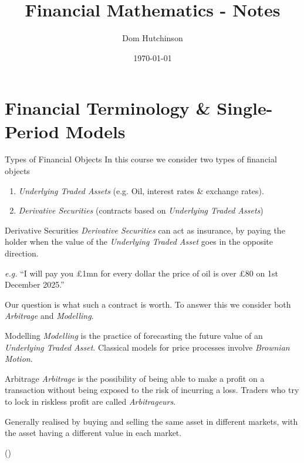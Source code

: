 \documentclass[11pt,a4paper]{article}
\begin{document}
\title{Financial Mathematics - Notes}
\author{Dom Hutchinson}
\date{\today}
\maketitle

\tableofcontents\newpage

\section{Financial Terminology \& Single-Period Models}\label{sec_financial_terminology_and_single_period_model}

  \begin{proposition}{Types of Financial Objects}
    In this course we consider two types of financial objects
    \begin{enumerate}
      \item \textit{Underlying Traded Assets} (e.g. Oil, interest rates \& exchange rates).
      \item \textit{Derivative Securities} (contracts based on \textit{Underlying Traded Assets})
    \end{enumerate}
  \end{proposition}

  \begin{proposition}{Derivative Securities}
    \textit{Derivative Securities} can act as insurance, by paying the holder when the value of the \textit{Underlying Traded Asset} goes in the opposite direction.
    \par \textit{e.g.} ``I will pay you £1mn for every dollar the price of oil is over £80 on 1st December 2025.''
    \par Our question is what such a contract is worth. To answer this we consider both \textit{Arbitrage} and \textit{Modelling}.
  \end{proposition}

  \begin{definition}{Modelling}
    \textit{Modelling} is the practice of forecasting the future value of an \textit{Underlying Traded Asset}. Classical models for price processes involve \textit{Brownian Motion}.
  \end{definition}

  \begin{definition}{Arbitrage}\label{def_arbitrage}
    \textit{Arbitrage} is the possibility of being able to make a profit on a transaction without being exposed to the risk of incurring a loss. Traders who try to lock in riskless profit are called \textit{Arbitrageurs}.
    \par Generally realised by buying and selling the same asset in different markets, with the asset having a different value in each market.
    \par ()
  \end{definition}
\end{document}

